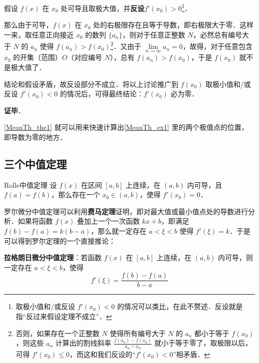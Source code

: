 假设 $f(x)$ 在 $x_0$ 处可导且取极大值，并\textbf{反设}$f'(x_0)>0$\footnote{取极小值和/或反设 $f'(x_0)<0$ 的情况可以类比，在此不赘述．反设就是指“反过来假设定理不成立”．}．

那么由于可导，$f(x)$ 在 $x_0$ 处的右极限存在且等于导数，即右极限大于零．这样一来，取任意正向接近 $x_0$ 的数列 $\{a_n\}$，则对于任意正整数 $N$，必然总有编号大于 $N$ 的 $a_n$ 使得 $f(a_n)>f(x_0)$\footnote{否则，如果存在一个正整数 $N$ 使得所有编号大于 $N$ 的 $a_n$ 都小于等于 $f(x_0)$，则这些 $a_n$ 计算出的割线斜率 $\frac{f(a_n)-f(x_0)}{a_n-x_0}$ 就小于等于零了，取极限以后，可得 $f'(x_0)\leq 0$，而这和我们反设的“$f'(x_0)<0$”相矛盾．}．又由于 $\lim\limits_{n\to\infty}a_n=0$，故得，对于任意包含 $x_0$ 的开集（范围）$O$（对应编号 $N$），总有 $f(a_n)>f(x_0)$，于是 $f(x_0)$ 就不是极大值了．

结论和假设矛盾，故反设部分不成立．将以上讨论推广到 $f(x_0)$ 取极小值和/或反设 $f'(x_0)<0$ 的情况后，可得最终结论：$f'(x_0)$ 必为零．

\textbf{证毕}．

\autoref{MeanTh_the1} 就可以用来快速计算出\autoref{MeanTh_ex1} 里的两个极值点的位置，即导数为零的地方．


\subsection{三个中值定理}


\begin{definition}{Rolle中值定理}
设 $f(x)$ 在区间 $[a, b]$ 上连续，在 $(a, b)$ 内可导，且 $f(a)=f(b)$，那么存在一个 $x_0\in(a, b)$，使得 $f'(x_0)=0$．
\end{definition}

罗尔微分中值定理可以利用\textbf{费马定理}证明，即对最大值或最小值点处的导数进行分析．如果将函数 $f(x)$ 叠加上一个一次函数 $kx+b$，即满足 $f(b)-f(a)=k(b-a)$，那么就一定存在 $a<\xi<b$ 使得 $f'(\xi)=k$．于是可以得到罗尔定理的一个直接推论：

\begin{theorem}{}
\textbf{拉格朗日微分中值定理}：若函数 $f(x)$ 在 $[a,b]$ 上连续，在 $(a,b)$ 内可导，则一定存在 $a<\xi<b$，使得
\begin{equation}
f'(\xi)=\frac{f(b)-f(a)}{b-a}
\end{equation}
\end{theorem}
